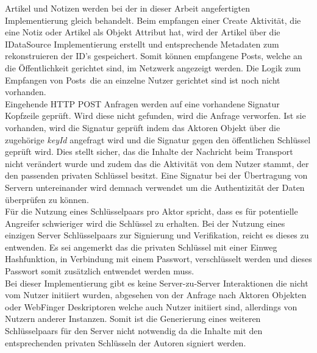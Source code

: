 Artikel und Notizen werden bei der in dieser Arbeit angefertigten Implementierung gleich behandelt. Beim empfangen einer Create Aktivität, die eine Notiz oder Artikel als Objekt Attribut hat, wird der Artikel über die IDataSource Implementierung erstellt und entsprechende Metadaten zum rekonstruieren der ID's gespeichert. Somit können empfangene \glqq Posts\grqq, welche an die Öffentlichkeit gerichtet sind, im Netzwerk angezeigt werden. Die Logik zum Empfangen von \glqq Posts\grqq~die an einzelne Nutzer gerichtet sind ist noch nicht vorhanden.\\

Eingehende HTTP POST Anfragen werden auf eine vorhandene Signatur Kopfzeile geprüft. Wird diese nicht gefunden, wird die Anfrage verworfen. Ist sie vorhanden, wird die Signatur geprüft indem das Aktoren Objekt über die zugehörige \textit{keyId} angefragt wird und die Signatur gegen den öffentlichen Schlüssel geprüft wird. Dies stellt sicher, das die Inhalte der Nachricht beim Transport nicht verändert wurde und zudem das die Aktivität von dem Nutzer stammt, der den passenden privaten Schlüssel besitzt. Eine Signatur bei der Übertragung von Servern untereinander wird demnach verwendet um die Authentizität der Daten überprüfen zu können.\\

Für die Nutzung eines Schlüsselpaars pro Aktor spricht, dass es für potentielle Angreifer schwieriger wird die Schlüssel zu erhalten. Bei der Nutzung eines einzigen Server Schlüsselpaars zur Signierung und Verifikation, reicht es dieses zu entwenden. Es sei angemerkt das die privaten Schlüssel mit einer Einweg Hashfunktion, in Verbindung mit einem Passwort, verschlüsselt werden und dieses Passwort somit zusätzlich entwendet werden muss.\\

Bei dieser Implementierung gibt es keine Server-zu-Server Interaktionen die nicht vom Nutzer initiiert wurden, abgesehen von der Anfrage nach Aktoren Objekten oder WebFinger Deskriptoren welche auch Nutzer initiiert sind, allerdings von Nutzern anderer Instanzen. Somit ist die Generierung eines weiteren Schlüsselpaars für den Server nicht notwendig da die Inhalte mit den entsprechenden privaten Schlüsseln der Autoren signiert werden.